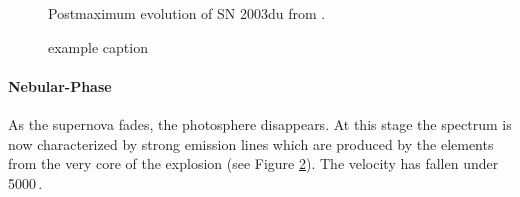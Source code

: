 \begin{figure}[htbp] %
   \centering
   \caption{Postmaximum evolution of SN 2003du from \cite{2011MNRAS.410.1725T}.}
   \label{fig:sn2003du_t+17}
\end{figure}

\begin{figure}[htbp] %
   \centering

   \caption{example caption}
   \label{fig:sn2003du_nebular}
\end{figure}



\paragraph{Nebular-Phase}
As the supernova fades, the photosphere disappears. At this stage the spectrum is now characterized by strong emission lines which are produced by the elements from the very core of the explosion (see Figure \ref{fig:sn2003du_nebular}). The velocity has fallen under 5000\,\kms. 




